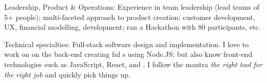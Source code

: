 \documentclass[10pt,a4paper]{article}
\begin{document}
\inlineheadsection  %
  {Leadership, Product \& Operations:}
  {Experience in team leadership (lead teams of 5+ people); multi-faceted approach to product creation: customer development, UX, financial modelling, development; ran a Hackathon with 80 participants, etc.}

\inlineheadsection  %
  {Technical specialties:}
  {Full-stack software design and implementation. I love to work on on the back-end creating ful s using Node.JS; but also know front-end technologies such as JavaScript, React,  and . I follow the mantra \emph{the right tool for the right job} and quickly pick things up.}

\spacedhrule{1.5em}{-0.4em}

\end{document}
